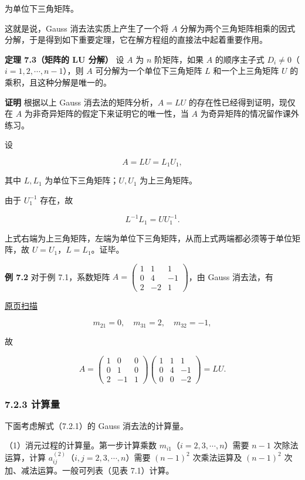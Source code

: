 \documentclass[
  10pt,
  fontset=fandol]{ctexart}
\begin{document}
为单位下三角矩阵。

这就是说，Gauss 消去法实质上产生了一个将 \(A\) 分解为两个三角矩阵相乘的因式分解，于是得到如下重要定理，它在解方程组的直接法中起着重要作用。

\textbf{定理 7.3（矩阵的 LU 分解）} 设 \(A\) 为 \(n\) 阶矩阵，如果 \(A\) 的顺序主子式 \(D_i\ne0\)（\(i=1,2,\cdots,n-1\)），则 \(A\) 可分解为一个单位下三角矩阵 \(L\) 和一个上三角矩阵 \(U\) 的乘积，且这种分解是唯一的。

\textbf{证明} 根据以上 Gauss 消去法的矩阵分析，\(A=LU\) 的存在性已经得到证明，现仅在 \(A\) 为非奇异矩阵的假定下来证明它的唯一性，当 \(A\) 为奇异矩阵的情况留作课外练习。

设

\[A=LU=L_1U_1,\]

其中 \(L,L_1\) 为单位下三角矩阵；\(U,U_1\) 为上三角矩阵。

由于 \(U_1^{-1}\) 存在，故

\[L^{-1}L_1=UU_1^{-1}.\]

上式右端为上三角矩阵，左端为单位下三角矩阵，从而上式两端都必须等于单位矩阵，故 \(U=U_1\)，\(L=L_1\)。证毕。

\textbf{例 7.2} 对于例 7.1，系数矩阵 \(A=\begin{pmatrix}1&1&1\\0&4&-1\\2&-2&1\end{pmatrix}\)，由 Gauss 消去法，有

\href{../../source-images/pdf-183.jpeg}{原页扫描}

\[m_{21}=0,\quad m_{31}=2,\quad m_{32}=-1,\]

故

\[
A=\begin{pmatrix}1&0&0\\0&1&0\\2&-1&1\end{pmatrix}
\begin{pmatrix}1&1&1\\0&4&-1\\0&0&-2\end{pmatrix}=LU.
\]

\subsubsection{7.2.3 计算量}\label{ux8ba1ux7b97ux91cf}

下面考虑解式（7.2.1）的 Gauss 消去法的计算量。

（1）消元过程的计算量。第一步计算乘数 \(m_{i1}\)（\(i=2,3,\cdots,n\)）需要 \(n-1\) 次除法运算，计算 \(a_{ij}^{(2)}\)（\(i,j=2,3,\cdots,n\)）需要 \((n-1)^2\) 次乘法运算及 \((n-1)^2\) 次加、减法运算。一般可列表（见表 7.1）计算。
\end{document}
